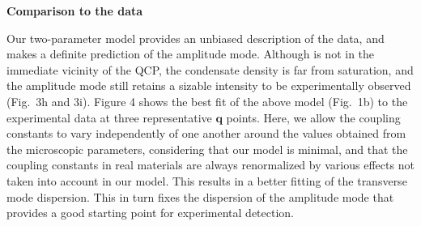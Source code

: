 \vspace{ 10 pt}
\noindent
{\bf Comparison to the data}

\noindent
Our two-parameter model provides an unbiased description of the data, and makes a definite prediction of the amplitude mode. Although \CRO is not in the immediate vicinity of the QCP, the condensate density is far from saturation, and the amplitude mode still retains a sizable intensity to be experimentally observed (Fig.~3h and 3i). Figure 4 shows the best fit of the above model (Fig.~1b) to the experimental data at three representative $\mathbf{q}$ points. Here, we allow the coupling constants to vary independently of one another around the values obtained from the microscopic parameters, considering that our model is minimal, and that the coupling constants in real materials are always renormalized by various effects not taken into account in our model. This results in a better fitting of the transverse mode dispersion. This in turn fixes the dispersion of the amplitude mode that provides a good starting point for experimental detection. 

  
  
  
  
  
